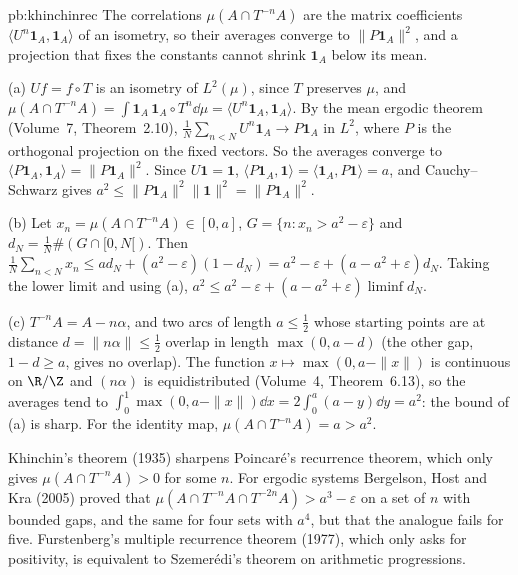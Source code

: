 \begin{solution}{pb:khinchinrec}
\idea The correlations $\mu(A\cap T^{-n}A)$ are the matrix coefficients $\langle U^n\mathbf 1_A,\mathbf 1_A\rangle$ of an isometry, so their averages converge to $\|P\mathbf 1_A\|^2$, and a projection
that fixes the constants cannot shrink $\mathbf 1_A$ below its mean.

\writeup (a) $Uf=f\circ T$ is an isometry of $L^2(\mu)$, since $T$ preserves $\mu$, and $\mu(A\cap T^{-n}A)=\int\mathbf 1_A\,\mathbf 1_A\circ T^n\dd\mu=\langle U^n\mathbf 1_A,\mathbf 1_A\rangle$. By the mean ergodic
theorem (Volume~7, Theorem~2.10), $\frac1N\sum_{n<N}U^n\mathbf 1_A\to P\mathbf 1_A$ in $L^2$, where $P$ is the orthogonal projection on the fixed vectors. So the averages converge to
$\langle P\mathbf 1_A,\mathbf 1_A\rangle=\|P\mathbf 1_A\|^2$. Since $U\mathbf 1=\mathbf 1$, $\langle P\mathbf 1_A,\mathbf 1\rangle=\langle\mathbf 1_A,P\mathbf 1\rangle=a$, and Cauchy--Schwarz gives
$a^2\le\|P\mathbf 1_A\|^2\|\mathbf 1\|^2=\|P\mathbf 1_A\|^2$.

(b) Let $x_n=\mu(A\cap T^{-n}A)\in[0,a]$, $G=\{n:x_n>a^2-\varepsilon\}$ and $d_N=\frac1N\#(G\cap[0,N[)$. Then
$\frac1N\sum_{n<N}x_n\le ad_N+(a^2-\varepsilon)(1-d_N)=a^2-\varepsilon+(a-a^2+\varepsilon)d_N$. Taking the lower limit and using (a), $a^2\le a^2-\varepsilon+(a-a^2+\varepsilon)\liminf d_N$.

(c) $T^{-n}A=A-n\alpha$, and two arcs of length $a\le\frac12$ whose starting points are at distance $d=\|n\alpha\|\le\frac12$ overlap in length $\max(0,a-d)$ (the other gap, $1-d\ge a$, gives no
overlap). The function $x\mapsto\max(0,a-\|x\|)$ is continuous on $\R/\Z$ and $(n\alpha)$ is equidistributed (Volume~4, Theorem~6.13), so the averages tend to
$\int_0^1\max(0,a-\|x\|)\dd x=2\int_0^a(a-y)\dd y=a^2$: the bound of (a) is sharp. For the identity map, $\mu(A\cap T^{-n}A)=a>a^2$.

\leads Khinchin's theorem (1935) sharpens Poincaré's recurrence theorem, which only gives $\mu(A\cap T^{-n}A)>0$ for some $n$. For ergodic systems Bergelson, Host and Kra (2005) proved that
$\mu(A\cap T^{-n}A\cap T^{-2n}A)>a^3-\varepsilon$ on a set of $n$ with bounded gaps, and the same for four sets with $a^4$, but that the analogue fails for five. Furstenberg's multiple
recurrence theorem (1977), which only asks for positivity, is equivalent to Szemerédi's theorem on arithmetic progressions.
\end{solution}

